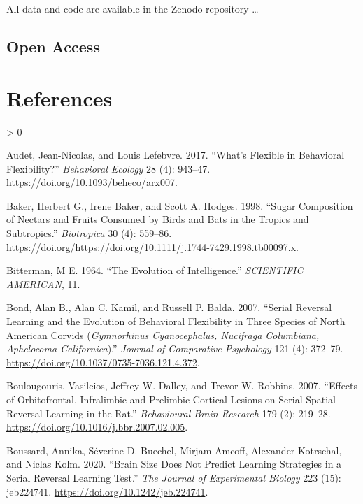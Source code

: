\documentclass[
]{article}
\newlength{\cslhangindent}
\newenvironment{CSLReferences}[2] %
 {%
  \setlength{\parindent}{0pt}
  \ifodd #1 \everypar{\setlength{\hangindent}{\cslhangindent}}\ignorespaces\fi
  \ifnum #2 > 0
  \setlength{\parskip}{#2\baselineskip}
  \fi
 }%
 {}
\begin{document}
All data and code are available in the Zenodo repository \ldots{}

\hypertarget{open-access}{%
\subsection{Open Access}\label{open-access}}

\hypertarget{references}{%
\section*{References}\label{references}}

\hypertarget{refs}{}
\begin{CSLReferences}{1}{0}
\leavevmode\hypertarget{ref-audet_whats_2017}{}%
Audet, Jean-Nicolas, and Louis Lefebvre. 2017. {``What's Flexible in Behavioral Flexibility?''} \emph{Behavioral Ecology} 28 (4): 943--47. \url{https://doi.org/10.1093/beheco/arx007}.

\leavevmode\hypertarget{ref-baker_sugar_1998}{}%
Baker, Herbert G., Irene Baker, and Scott A. Hodges. 1998. {``Sugar {Composition} of {Nectars} and {Fruits} {Consumed} by {Birds} and {Bats} in the {Tropics} and {Subtropics}.''} \emph{Biotropica} 30 (4): 559--86. https://doi.org/\url{https://doi.org/10.1111/j.1744-7429.1998.tb00097.x}.

\leavevmode\hypertarget{ref-bitterman_evolution_1964}{}%
Bitterman, M E. 1964. {``The {Evolution} of {Intelligence}.''} \emph{SCIENTIFIC AMERICAN}, 11.

\leavevmode\hypertarget{ref-bond_serial_2007-1}{}%
Bond, Alan B., Alan C. Kamil, and Russell P. Balda. 2007. {``Serial Reversal Learning and the Evolution of Behavioral Flexibility in Three Species of {North} {American} Corvids (\emph{{Gymnorhinus} Cyanocephalus, {Nucifraga} Columbiana, {Aphelocoma} Californica}).''} \emph{Journal of Comparative Psychology} 121 (4): 372--79. \url{https://doi.org/10.1037/0735-7036.121.4.372}.

\leavevmode\hypertarget{ref-boulougouris_effects_2007}{}%
Boulougouris, Vasileios, Jeffrey W. Dalley, and Trevor W. Robbins. 2007. {``Effects of Orbitofrontal, Infralimbic and Prelimbic Cortical Lesions on Serial Spatial Reversal Learning in the Rat.''} \emph{Behavioural Brain Research} 179 (2): 219--28. \url{https://doi.org/10.1016/j.bbr.2007.02.005}.

\leavevmode\hypertarget{ref-boussard_brain_2020}{}%
Boussard, Annika, Séverine D. Buechel, Mirjam Amcoff, Alexander Kotrschal, and Niclas Kolm. 2020. {``Brain Size Does Not Predict Learning Strategies in a Serial Reversal Learning Test.''} \emph{The Journal of Experimental Biology} 223 (15): jeb224741. \url{https://doi.org/10.1242/jeb.224741}.


\end{CSLReferences}
\end{document}
